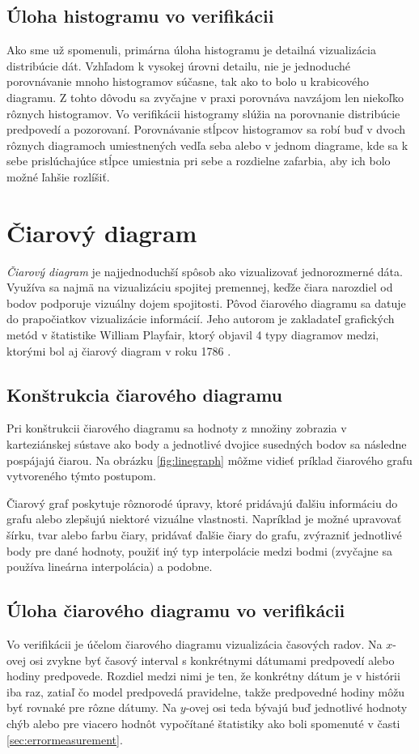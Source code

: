  
\subsection{Úloha histogramu vo verifikácii}
Ako sme už spomenuli, primárna úloha histogramu je detailná vizualizácia distribúcie dát. Vzhľadom k vysokej úrovni detailu, nie je jednoduché porovnávanie mnoho histogramov súčasne, tak ako to bolo u krabicového diagramu. Z tohto dôvodu sa zvyčajne v praxi porovnáva navzájom len niekoľko rôznych histogramov. Vo verifikácii histogramy slúžia na porovnanie distribúcie predpovedí a pozorovaní. Porovnávanie stĺpcov histogramov sa robí buď v dvoch rôznych diagramoch umiestnených vedľa seba alebo v jednom diagrame, kde sa k sebe prislúchajúce stĺpce umiestnia pri sebe a rozdielne zafarbia, aby ich bolo možné ľahšie rozlíšiť.

\section{Čiarový diagram}
\textit{Čiarový diagram} je najjednoduchší spôsob ako vizualizovať jednorozmerné dáta. Využíva sa najmä na vizualizáciu spojitej premennej, keďže čiara narozdiel od bodov podporuje vizuálny dojem spojitosti. Pôvod čiarového diagramu sa datuje do prapočiatkov vizualizácie informácií. Jeho autorom je zakladateľ grafických metód v štatistike William Playfair, ktorý objavil 4 typy diagramov medzi, ktorými bol aj čiarový diagram v roku 1786 \cite{HistoryOfInfoVis}.

\subsection{Konštrukcia čiarového diagramu}
Pri konštrukcii čiarového diagramu sa hodnoty z množiny zobrazia v karteziánskej sústave ako body a jednotlivé dvojice susedných bodov sa následne pospájajú čiarou. Na obrázku \ref{fig:linegraph} môžme vidieť príklad čiarového grafu vytvoreného týmto postupom.

Čiarový graf poskytuje rôznorodé úpravy, ktoré pridávajú ďalšiu informáciu do grafu alebo zlepšujú niektoré vizuálne vlastnosti. Napríklad je možné upravovať šírku, tvar alebo farbu čiary, pridávať ďalšie čiary do grafu, zvýrazniť jednotlivé body pre dané hodnoty, použiť iný typ interpolácie medzi bodmi (zvyčajne sa používa lineárna interpolácia) a podobne.

\subsection{Úloha čiarového diagramu vo verifikácii}
Vo verifikácii je účelom čiarového diagramu vizualizácia časových radov. Na \mbox{$ x $-ovej} osi zvykne byť časový interval s konkrétnymi dátumami predpovedí alebo hodiny predpovede. Rozdiel medzi nimi je ten, že konkrétny dátum je v histórii iba raz, zatiaľ čo model predpovedá pravidelne, takže predpovedné hodiny môžu byť rovnaké pre rôzne dátumy. Na \mbox{$ y $-ovej} osi teda bývajú buď jednotlivé hodnoty chýb alebo pre viacero hodnôt vypočítané štatistiky ako boli spomenuté v časti \ref{sec:errormeasurement}.
 

